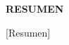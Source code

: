 \newenvironment{resumen}%
    {\thispagestyle{empty}\null\vfill\begin{center}%
    \bfseries RESUMEN\end{center}}%
    {~\vfill}
        \begin{resumen}
   		[Resumen]
   		
        \end{resumen}